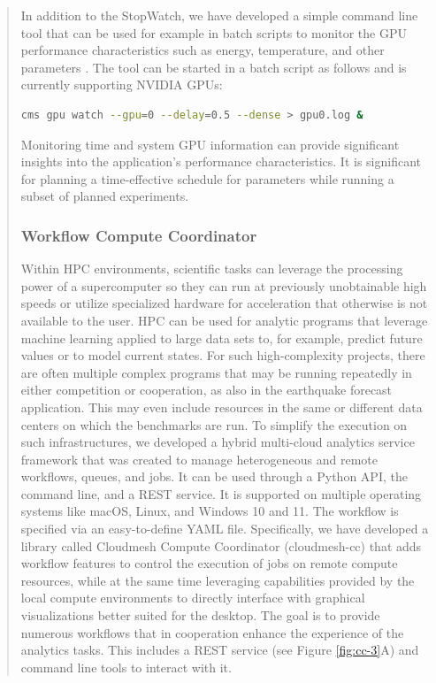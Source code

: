 \documentclass[utf8]{FrontiersinVancouver} %
\begin{document}
\begin{quote}
In addition to the StopWatch, we have developed a simple command line tool that can be used for example in batch scripts to monitor the GPU performance characteristics such as energy, temperature, and other parameters \citep{cloudmesh-gpu}. The tool can be started in a batch script as follows and is currently supporting NVIDIA GPUs:


\begin{lstlisting}[language=sh]
    cms gpu watch --gpu=0 --delay=0.5 --dense > gpu0.log &
\end{lstlisting}


Monitoring time and system GPU information can provide significant insights into the application's performance characteristics. It is significant for planning a time-effective schedule for parameters while running a subset of planned experiments.



\subsubsection{Workflow Compute Coordinator}
\label{sec:workflow-cc}


Within HPC environments, scientific tasks can leverage the processing power of a supercomputer so they can run at previously unobtainable high speeds or utilize specialized hardware for acceleration that otherwise is not available to the user. HPC can be used for analytic programs that leverage machine learning applied to large data sets to, for example, predict future values or to model current states. For such high-complexity projects, there are often multiple complex programs that may be running repeatedly in either competition or cooperation, as also in the earthquake forecast application.  This may even include resources in the same or different data centers on which the benchmarks are run. To simplify the execution on such infrastructures, we developed a hybrid multi-cloud analytics service framework that was created to manage heterogeneous and remote workflows, queues, and jobs.  It can be used through a Python API, the command line, and a REST service. It is supported on multiple operating systems like macOS, Linux, and Windows 10 and 11.  The workflow is specified via an easy-to-define YAML file.  Specifically, we have developed a library called Cloudmesh Compute Coordinator (cloudmesh-cc) \citep{las-22-arxiv-workflow-cc} that adds workflow features to control the execution of jobs on remote compute resources, while at the same time leveraging capabilities provided by the local compute environments to directly interface with graphical visualizations better suited for the desktop. The goal is to provide numerous workflows that in cooperation enhance the experience of the analytics tasks. This includes a REST service (see Figure \ref{fig:cc-3}A) and command line tools to interact with it.



\end{quote}
\end{document}
